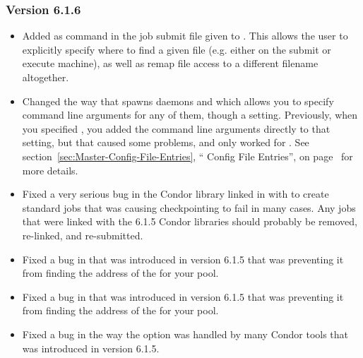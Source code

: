\subsubsection{\label{sec:New-6-1-6}Version 6.1.6}

\begin{itemize}

\item Added  as command in the job submit file given to
.
This allows the user to explicitly specify where to find a given file (e.g.
either on the submit or execute machine), as well as remap file access to a
different filename altogether.

\item Changed the way that  spawns daemons and
 which allows you to specify command line arguments for
any of them, though a  setting.
Previously, when you specified , you added the command
line arguments directly to that setting, but that caused some
problems, and only worked for .
See section~\ref{sec:Master-Config-File-Entries}, ``
Config File Entries'', on
page~\pageref{sec:Master-Config-File-Entries} for more details.

\item Fixed a very serious bug in the Condor library linked in with
 to create standard jobs that was causing
checkpointing to fail in many cases.  
Any jobs that were linked with the 6.1.5 Condor libraries should
probably be removed, re-linked, and re-submitted. 

\item Fixed a bug in  that was introduced in version
6.1.5 that was preventing it from finding the address of the
 for your pool.

\item Fixed a bug in  that was introduced in version
6.1.5 that was preventing it from finding the address of the
 for your pool.

\item Fixed a bug in the way the  option was handled by
many Condor tools that was introduced in version 6.1.5. 



\end{itemize}
